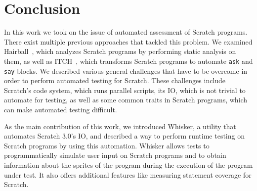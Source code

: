 \chapter{Conclusion}
\label{cha:conclusion}


In this work we took on the issue of automated assessment of Scratch programs.
There exist multiple previous approaches that tackled this problem.
We examined Hairball~\cite{hairball}, which analyzes Scratch programs by performing static analysis on them,
as well as ITCH~\cite{itch}, which transforms Scratch programs to automate \texttt{ask} and \texttt{say} blocks.
We described various general challenges that have to be overcome in order to perform automated testing for Scratch.
These challenges include Scratch's code system, which runs parallel scripts, its IO, which is not trivial to automate for testing,
as well as some common traits in Scratch programs, which can make automated testing difficult.
\parspace

As the main contribution of this work, we introduced Whisker, a utility that automates Scratch 3.0's IO,
and described a way to perform runtime testing on Scratch programs by using this automation.
Whisker allows tests to programmatically simulate user input on Scratch programs
and to obtain information about the sprites of the program during the execution of the program under test.
It also offers additional features like measuring statement coverage for Scratch.
\parspace

